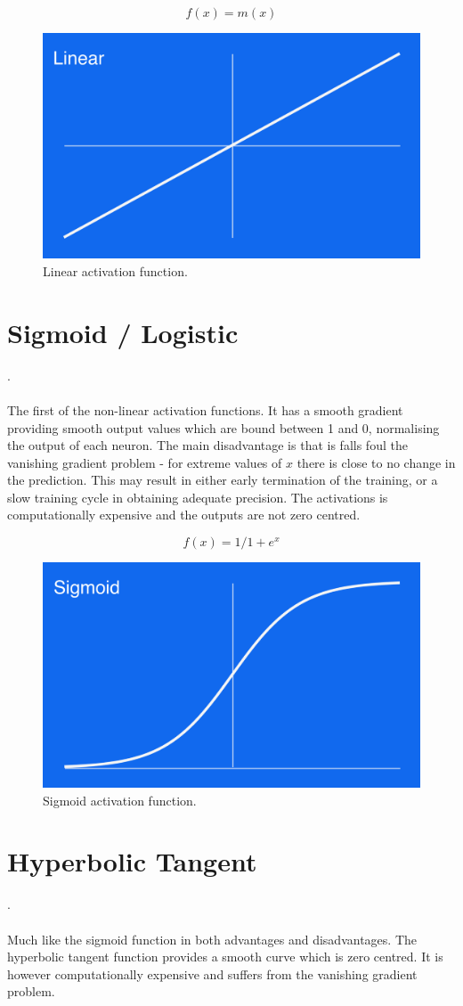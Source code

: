 \begin{appendices}
\begin{equation}
    f(x) = m(x)
\end{equation}
\begin{figure}[H]
\centering
\includegraphics[width=.265\textwidth]{4fig/linear.png}
\caption{Linear activation function.}
\end{figure}

\section{Sigmoid / Logistic}.\\\\
The first of the non-linear activation functions. It has a smooth gradient providing smooth output values which are bound between 1 and 0, normalising the output of each neuron. The main disadvantage is that is falls foul the vanishing gradient problem - for extreme values of $x$ there is close to no change in the prediction. This may result in either early termination of the training, or a slow training cycle in obtaining adequate precision. The activations is computationally expensive and the outputs are not zero centred.

\begin{equation}
    f(x) = 1/1+e^x
\end{equation}
\begin{figure}[H]
\centering
\includegraphics[width=.265\textwidth]{4fig/sigmoid.png}
\caption{Sigmoid activation function.}
\end{figure}


\section{Hyperbolic Tangent}.\\\\
Much like the sigmoid function in both advantages and disadvantages. The hyperbolic tangent function provides a smooth curve which is zero centred. It is however computationally expensive and suffers from the vanishing gradient problem.


\end{appendices}

